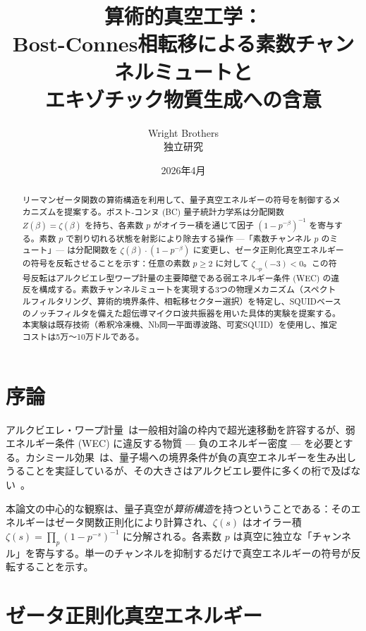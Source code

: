 \documentclass[11pt,a4paper]{article}
\begin{document}
\title{算術的真空工学：\\Bost-Connes相転移による素数チャンネルミュートと\\エキゾチック物質生成への含意}
\author{Wright Brothers\\{\small 独立研究}}
\date{2026年4月}
\maketitle

\begin{abstract}
リーマンゼータ関数の算術構造を利用して、量子真空エネルギーの符号を制御するメカニズムを提案する。ボスト-コンヌ (BC) 量子統計力学系は分配関数 $Z(\beta) = \zeta(\beta)$ を持ち、各素数 $p$ がオイラー積を通じて因子 $(1-p^{-\beta})^{-1}$ を寄与する。素数 $p$ で割り切れる状態を射影により除去する操作 ---「素数チャンネル $p$ のミュート」--- は分配関数を $\zeta(\beta)\cdot(1-p^{-\beta})$ に変更し、ゼータ正則化真空エネルギーの符号を反転させることを示す：任意の素数 $p \geq 2$ に対して $\zeta_{\neg p}(-3) < 0$。この符号反転はアルクビエレ型ワープ計量の主要障壁である弱エネルギー条件 (WEC) の違反を構成する。素数チャンネルミュートを実現する3つの物理メカニズム（スペクトルフィルタリング、算術的境界条件、相転移セクター選択）を特定し、SQUIDベースのノッチフィルタを備えた超伝導マイクロ波共振器を用いた具体的実験を提案する。本実験は既存技術（希釈冷凍機、Nb同一平面導波路、可変SQUID）を使用し、推定コストは5万〜10万ドルである。
\end{abstract}

\section{序論}

アルクビエレ・ワープ計量~\cite{Alcubierre1994}は一般相対論の枠内で超光速移動を許容するが、弱エネルギー条件 (WEC) に違反する物質 --- 負のエネルギー密度 --- を必要とする。カシミール効果~\cite{Casimir1948}は、量子場への境界条件が負の真空エネルギーを生み出しうることを実証しているが、その大きさはアルクビエレ要件に多くの桁で及ばない~\cite{PfenningFord1997}。

本論文の中心的な観察は、量子真空が\emph{算術構造}を持つということである：そのエネルギーはゼータ関数正則化により計算され、$\zeta(s)$ はオイラー積 $\zeta(s) = \prod_p (1-p^{-s})^{-1}$ に分解される。各素数 $p$ は真空に独立な「チャンネル」を寄与する。単一のチャンネルを抑制するだけで真空エネルギーの符号が反転することを示す。

\section{ゼータ正則化真空エネルギー}
\end{document}
